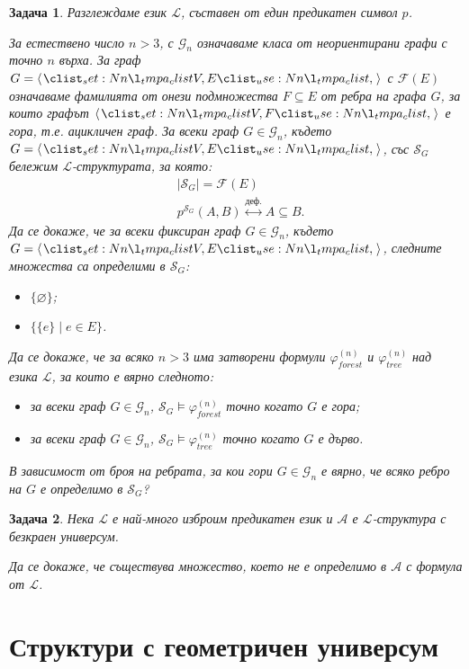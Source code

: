 \documentclass[12pt]{article}
\newcommand{\calA}{\mathcal{A}}
\newcommand{\calS}{\mathcal{S}}
\newcommand{\calL}{\mathcal{L}}
\newcommand{\calF}{\mathcal{F}}
\newcommand{\calG}{\mathcal{G}}
\newcommand{\dequiv}{\stackrel{\text{деф.}}{\longleftrightarrow}}
\newtheorem{problem}{Задача}[section]
\theoremstyle{definition}
\begin{document}
\begin{problem}
Разглеждаме език $\calL$, съставен от един предикатен символ $p$.

За естествено число $n > 3$, с $\calG_n$ означаваме класа от неориентирани графи с точно $n$ върха.
За граф $G = \opair{V, E}$ с $\calF(E)$ означаваме фамилията от онези подмножества $F \subseteq E$ от ребра на графа $G$, за които графът $\opair{V, F}$ е гора, т.е. ацикличен граф.
За всеки граф $G \in \calG_n$, където $G = \opair{V, E}$, със $\calS_G$ бележим $\calL$-структурата, за която:
\begin{align*}
     & |\calS_G| = \calF(E)                     \\
     & p^{\calS_G}(A, B) \dequiv A \subseteq B.
\end{align*}
Да се докаже, че за всеки фиксиран граф $G \in \calG_n$, където $G = \opair{V, E}$, следните множества са определими в $\calS_G$:
\begin{itemize}
    \item[а)] $\{ \varnothing \}$;
    \item[б)] $\{ \{ e \} \mid e \in E \}$.
\end{itemize}
Да се докаже, че за всяко $n > 3$ има затворени формули $\varphi^{(n)}_{forest}$ и $\varphi^{(n)}_{tree}$ над езика $\calL$, за които е вярно следното:
\begin{itemize}
    \item[а)] за всеки граф $G \in \calG_n$, $\calS_G \models \varphi^{(n)}_{forest}$ точно когато $G$ е гора;
    \item[б)] за всеки граф $G \in \calG_n$, $\calS_G \models \varphi^{(n)}_{tree}$ точно когато $G$ е дърво.
\end{itemize}
В зависимост от броя на ребрата, за кои гори $G \in \calG_n$ е вярно, че всяко ребро на $G$ е определимо в $\calS_G$?
\end{problem}

\begin{problem}
Нека $\calL$ е най-много изброим предикатен език и $\calA$ е $\calL$-структура с безкраен универсум.

Да се докаже, че съществува множество, което не е определимо в $\calA$ с формула от $\calL$.
\end{problem}

\newpage

\section{Структури с геометричен универсум}
\end{document}
